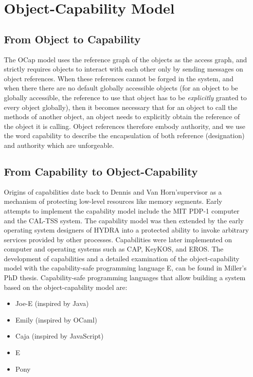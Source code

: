 \documentclass[a4paper,11pt,twoside]{article}
\begin{document}
\section{Object-Capability Model}\label{sec:ocapmodel}
\subsection{From Object to Capability}
The OCap model uses the reference graph of the objects as the access graph, and strictly requires objects to interact with each other only by sending messages on object references\cite{miller2003b}. When these references cannot be forged in the system, and when there there are no default globally accessible objects (for an object to be globally accessible, the reference to use that object has to be \textit{explicitly} granted to every object globally), then it becomes necessary that for an object to call the methods of another object, an object needs to explicitly obtain the reference of the object it is calling.  Object references therefore embody authority, and we use the word capability to describe the encapsulation of both reference (designation) and authority which are unforgeable. 

\subsection{From Capability to Object-Capability}
Origins of capabilities date back to Dennis and Van Horn\cite{dennis1966}'supervisor as a mechanism of protecting low-level resources like memory segments. Early attempts to implement the capability model include the MIT PDP-1 computer and the CAL-TSS system. The capability model was then extended by the early operating system designers of HYDRA\cite{wulf1974} into a protected ability to invoke arbitrary services provided by other processes. Capabilities were later implemented on computer and operating systems such as CAP\cite{wilkes1979}, KeyKOS\cite{hardy1985}, and EROS\cite{shapiro1999}. The development of capabilities and a detailed examination of the object-capability model with the capability-safe programming language E, can be found in Miller's PhD thesis\cite{miller2006}. Capability-safe programming languages that allow building a system based on the object-capability model are:\begin{itemize}
\item Joe-E (inspired by Java)
\item Emily (inspired by OCaml)
\item Caja (inspired by JavaScript)
\item E
\item Pony
\end{itemize}
\end{document}
